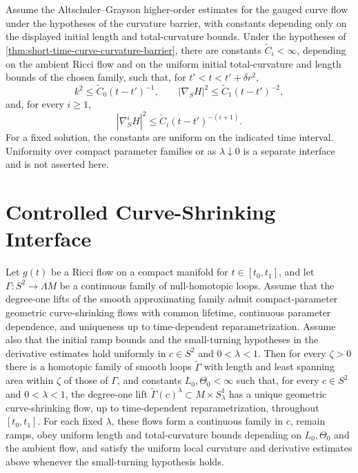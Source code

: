 \begin{theorem}
\label{thm:curve-shrinking-derivative-estimates}
\notready
Assume the Altschuler--Grayson higher-order estimates for the gauged curve
flow under the hypotheses of the curvature barrier, with constants depending
only on the displayed initial length and total-curvature bounds.  Under the
hypotheses of \ref{thm:short-time-curve-curvature-barrier}, there
are constants
$\widetilde C_i<\infty$, depending on the ambient Ricci flow and on the
uniform initial total-curvature and length bounds of the chosen family, such
that, for $t'<t<t'+\delta r^2$,
\[
 k^2\le \widetilde C_0(t-t')^{-1},\qquad
 |\nabla_SH|^2\le\widetilde C_1(t-t')^{-2},
\]
and, for every $i\ge1$,
\[
 |\nabla_S^iH|^2\le\widetilde C_i(t-t')^{-(i+1)}.
\]
For a fixed solution, the constants are uniform on the indicated time
interval.  Uniformity over compact parameter families or as
$\lambda\downarrow0$ is a separate interface and is not asserted here.
\end{theorem}

\section{Controlled Curve-Shrinking Interface}

\begin{theorem}
\label{thm:controlled-curve-shrinking-existence}
\notready
Let $g(t)$ be a Ricci flow on a compact manifold for
$t\in[t_0,t_1]$, and let
$\Gamma\colon S^2\to\Lambda M$ be a continuous family of null-homotopic
loops.  Assume that the degree-one lifts of the smooth approximating family
admit compact-parameter geometric curve-shrinking flows with common lifetime,
continuous parameter dependence, and uniqueness up to time-dependent
reparametrization.  Assume also that the initial ramp bounds and the
small-turning hypotheses in the derivative estimates hold uniformly in
$c\in S^2$ and $0<\lambda<1$.  Then for every $\zeta>0$ there is a homotopic family of smooth loops
$\widetilde\Gamma$ with length and least spanning area within $\zeta$ of
those of $\Gamma$, and constants $L_0,\Theta_0<\infty$ such that, for every
$c\in S^2$ and $0<\lambda<1$, the degree-one lift
$\widetilde\Gamma(c)^\lambda\subset M\times S^1_\lambda$ has a unique
geometric curve-shrinking flow, up to time-dependent reparametrization,
throughout $[t_0,t_1]$.  For each fixed $\lambda$, these flows form a
continuous family in $c$, remain ramps, obey uniform length and
total-curvature bounds depending
on $L_0,\Theta_0$ and the ambient flow, and satisfy the uniform local
curvature and derivative estimates above whenever the small-turning
hypothesis holds.
\end{theorem}

